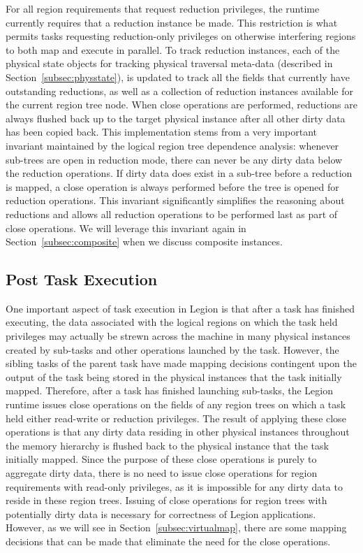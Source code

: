 For all region requirements that request reduction
privileges, the runtime currently requires that a 
reduction instance be made. This restriction is what
permits tasks requesting reduction-only privileges
on otherwise interfering regions to both map and
execute in parallel. To track reduction instances,
each of the physical state objects for tracking
physical traversal meta-data (described in 
Section~\ref{subsec:physstate}), is updated to
track all the fields that currently have outstanding
reductions, as well as a collection of reduction
instances available for the current region tree node.
When close operations are performed, reductions are
always flushed back up to the target physical instance
after all other dirty data has been copied back. This
implementation stems from a very important invariant
maintained by the logical region tree dependence
analysis: whenever sub-trees are open in reduction mode,
there can never be any dirty data below the reduction 
operations. If dirty data does exist in a sub-tree before
a reduction is mapped, a close operation  is always performed
before the tree is opened for reduction operations.
This invariant significantly simplifies the reasoning 
about reductions and allows all reduction operations
to be performed last as part of close operations. We
will leverage this invariant again in Section~\ref{subsec:composite}
when we discuss composite instances.

\subsection{Post Task Execution}
\label{subsec:postexec}
One important aspect of task execution in Legion is
that after a task has finished executing, the data
associated with the logical regions on which the task
held privileges may actually be strewn across the 
machine in many physical instances created by sub-tasks
and other operations launched by the task.  However,
the sibling tasks of the parent task have made mapping
decisions contingent upon the output of the task being
stored in the physical instances that the task initially
mapped. Therefore, after a task has finished launching
sub-tasks, the Legion runtime issues close operations on
the fields of any region trees on which a task held
either read-write or reduction privileges. The result
of applying these close operations is that any dirty 
data residing in other physical instances throughout
the memory hierarchy is flushed back to the physical
instance that the task initially mapped. Since the
purpose of these close operations is purely to 
aggregate dirty data, there is no need to issue
close operations for region requirements with 
read-only privileges, as it is impossible for any
dirty data to reside in these region trees. Issuing
of close operations for region trees with potentially
dirty data is necessary for correctness of Legion
applications.  However, as we will see in 
Section~\ref{subsec:virtualmap}, there are some
mapping decisions that can be made that eliminate
the need for the close operations.


